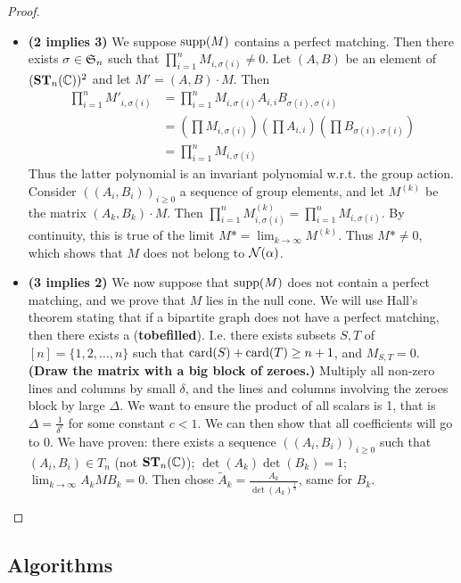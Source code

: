 \begin{proof}
\begin{itemize}
\item \textbf{(2 implies 3)} We suppose $\supp{M}$ contains a perfect matching. Then there exists $\sigma\in \permutationgroup[n]$ such that $\prod_{i=1}^n M_{i,\sigma(i)} \neq 0$. Let $(A,B)$ be an element of $(\ST{\complexN})^2$ and let $M'=(A,B)\cdot M$. Then 
\begin{align*}
\prod_{i=1}^n M'_{i,\sigma(i)} 
	&= \prod_{i=1}^n M_{i,\sigma(i)} A_{i,i} B_{\sigma(i),\sigma(i)} \\
	&= \left( \prod M_{i,\sigma(i)} \right)  \left( \prod A_{i,i} \right)  \left( \prod B_{\sigma(i),\sigma(i)} \right) \\
	&= \prod_{i=1}^n M_{i,\sigma(i)}
\end{align*}
Thus the latter polynomial is an invariant polynomial w.r.t. the group action. Consider $((A_i,B_i))_{i\geqslant 0}$ a sequence of group elements, and let $M^{(k)}$ be the matrix $(A_k,B_k)\cdot M$. Then $\prod_{i=1}^n M^{(k)}_{i,\sigma(i)}  = \prod_{i=1}^n M_{i,\sigma(i)}$. By continuity, this is true of the limit $M*=\lim_{k\rightarrow\infty} M^{(k)}$. Thus $M*\neq 0$, which shows that $M$ does not belong to $\nullcone{\alpha}$.
 
\item \textbf{(3 implies 2)} We now suppose that $\supp{M}$ does not contain a perfect matching, and we prove that $M$ lies in the null cone. We will use Hall's theorem stating that if a bipartite graph does not have a perfect matching, then there exists a (\textbf{tobefilled}). I.e. there exists subsets $S,T$ of $[n]=\{1,2,\dots,n\}$ such that $\size{S}+\size{T} \geq n+1$, and $M_{S,T}=0$.
 \textbf{(Draw the matrix with a big block of zeroes.)} Multiply all non-zero lines and columns by small $\delta$, and the lines and columns involving the zeroes block by large $\Delta$. We want to ensure the product of all scalars is 1, that is $\Delta=\frac{1}{\delta^c}$ for some constant $c<1$. We can then show that all coefficients will go to $0$. 
 We have proven: there exists a sequence $((A_i,B_i))_{i\geqslant 0}$ such that $(A_i,B_i)\in T_n$ (not $\ST{\complexN}$); $\det(A_k)\det(B_k)=1$; $\lim_{k\rightarrow\infty} A_k M B_k =0$. Then chose $\tilde{A}_k = \frac{A_k}{\det(A_k)^{\frac{1}{n}}}$, same for $B_k$.
 \end{itemize}
 \end{proof}
 
 \subsection{Algorithms}
 
